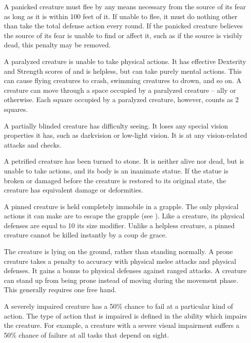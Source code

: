  A panicked creature must flee by any means necessary from the source of its fear as long as it is within 100 feet of it. If unable to flee, it must do nothing other than take the total defense action every round.
If the panicked creature believes the source of its fear is unable to find or affect it, such as if the source is visibly dead, this penalty may be removed.

 A paralyzed creature is unable to take physical actions. It has effective Dexterity and Strength scores of  and is helpless, but can take purely mental actions. This can cause flying creatures to crash, swimming creatures to drown, and so on. A creature can move through a space occupied by a paralyzed creature -- ally or otherwise. Each square occupied by a paralyzed creature, however, counts as 2 squares.

 A partially blinded creature has difficulty seeing. It loses any special vision properties it has, such as darkvision or low-light vision. It is \impaired at any vision-related attacks and checks.

 A petrified creature has been turned to stone. It is neither alive nor dead, but is unable to take actions, and its body is an inanimate statue. If the statue is broken or damaged before the creature is restored to its original state, the creature has equivalent damage or deformities.

 A pinned creature is held completely immobile in a grapple.
The only physical actions it can make are to escape the grapple (see ).
Like a  creature, its physical defenses are equal to 10 \add its size modifier.
Unlike a helpless creature, a pinned creature cannot be killed instantly by a coup de grace.

 The creature is lying on the ground, rather than standing normally. A prone creature takes a  penalty to accuracy with physical melee attacks and physical defenses. It gains a  bonus to physical defenses against ranged attacks.
A creature can stand up from being prone instead of moving during the movement phase.
This generally requires one free hand.

 A severely impaired creature has a 50\% chance to fail at a particular kind of action. The type of action that is impaired is defined in the ability which impairs the creature. For example, a creature with a severe visual impairment suffers a 50\% chance of failure at all tasks that depend on sight.

